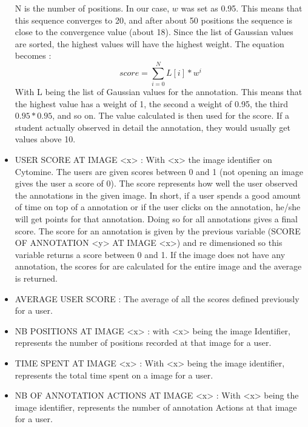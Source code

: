 \documentclass[a4paper,11pt]{report}
\numberwithin{figure}{section} %
\begin{document}
\begin{itemize}
N is the number of positions. In our case, $w$ was set as 0.95. This means that this sequence converges to 20, and after about 50 positions the sequence is close to the convergence value (about 18). Since the list of Gaussian values are sorted, the highest values will have the highest weight. The equation becomes :
	$$score = \sum\limits_{i=0}^N L[i]*w^i$$
With L being the list of Gaussian values for the annotation. This means that the highest value has a weight of 1, the second a weight of 0.95, the third $0.95*0.95$, and so on. The value calculated is then used for the score. If a student actually observed in detail the annotation, they would usually get values above 10.\\

    \item[\textbullet] USER SCORE AT IMAGE <x> : With <x> the image identifier on Cytomine. The users are given scores between 0 and 1 (not opening an image gives the user a score of 0). The score represents how well the user observed the annotations in the given image. In short, if a user spends a good amount of time on top of a annotation or if the user clicks on the annotation, he/she will get points for that annotation. Doing so for all annotations gives a final score. The score for an annotation is given by the previous variable (SCORE OF ANNOTATION <y> AT IMAGE <x>) and re dimensioned so this variable returns a score between 0 and 1. If the image does not have any annotation, the scores for are calculated for the entire image and the average is returned. \\
    
    \item[\textbullet] AVERAGE USER SCORE : The average of all the scores defined previously for a user. \\
    
    \item[\textbullet] NB POSITIONS AT IMAGE <x> : with <x> being the image Identifier, represents the number of positions recorded at that image for a user. \\
    
   \item[\textbullet] TIME SPENT AT IMAGE <x> : With <x> being the image identifier, represents the total time spent on a image for a user. \\
   
   \item[\textbullet] NB OF ANNOTATION ACTIONS AT IMAGE <x> : With <x> being the image identifier, represents the number of annotation Actions at that image for a user. \\
      

\end{itemize}
\end{document}

